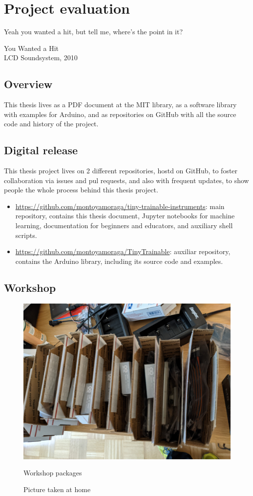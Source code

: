 \chapter{Project evaluation}

\epigraph{Yeah you wanted a hit, but tell me, where's the point in it?}{You Wanted a Hit \\ LCD Soundsystem, 2010}

\section{Overview}

This thesis lives as a PDF document at the MIT library, as a software library with examples for Arduino, and as repositories on GitHub with all the source code and history of the project.

\section{Digital release}

This thesis project lives on 2 different repositories, hostd on GitHub, to foster collaboration via issues and pul requests, and also with frequent updates, to show people the whole process behind this thesis project.

\begin{itemize}
  \item \url{https://github.com/montoyamoraga/tiny-trainable-instruments}: main repository, contains this thesis document, Jupyter notebooks for machine learning, documentation for beginners and educators, and auxiliary shell scripts.
  \item \url{https://github.com/montoyamoraga/TinyTrainable}: auxiliar repository, contains the Arduino library, including its source code and examples.
\end{itemize}

\section{Workshop}

\begin{figure}[h]
  \centering
  \includegraphics[width=0.75\linewidth,height=0.25\textheight,keepaspectratio]{images/workshop-packages.jpg}
  \caption{Workshop packages}
  \caption*{Picture taken at home}
  \label{fig:workshop-packages}
\end{figure}

